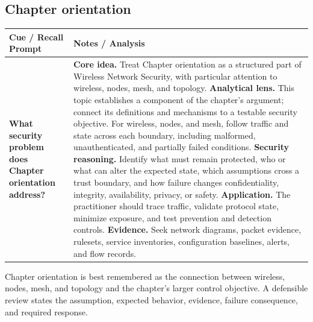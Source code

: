 \documentclass[11pt]{article}
\newcommand{\CornellHeader}{%
\rowcolor{Navy}\color{white}\bfseries Cue / Recall Prompt & \color{white}\bfseries Notes / Analysis\\\hline}
\newcommand{\CornellRow}[2]{%
\cellcolor{CueGray}\RaggedRight\textbf{#1} & \RaggedRight #2\\\hline}
\begin{document}
\subsection*{Chapter orientation}
\begin{longtable}{>{\RaggedRight\arraybackslash}p{}|>{\RaggedRight\arraybackslash}p{}}
\CornellHeader
\CornellRow{What security problem does Chapter orientation address?}{\textbf{Core idea.} Treat Chapter orientation as a structured part of Wireless Network Security, with particular attention to wireless, nodes, mesh, and topology. \textbf{Analytical lens.} This topic establishes a component of the chapter's argument; connect its definitions and mechanisms to a testable security objective. For wireless, nodes, and mesh, follow traffic and state across each boundary, including malformed, unauthenticated, and partially failed conditions. \textbf{Security reasoning.} Identify what must remain protected, who or what can alter the expected state, which assumptions cross a trust boundary, and how failure changes confidentiality, integrity, availability, privacy, or safety. \textbf{Application.} The practitioner should trace traffic, validate protocol state, minimize exposure, and test prevention and detection controls. \textbf{Evidence.} Seek network diagrams, packet evidence, rulesets, service inventories, configuration baselines, alerts, and flow records.}
\end{longtable}
\begin{topicsummary}
Chapter orientation is best remembered as the connection between wireless, nodes, mesh, and topology and the chapter's larger control objective. A defensible review states the assumption, expected behavior, evidence, failure consequence, and required response.
\end{topicsummary}
\end{document}
